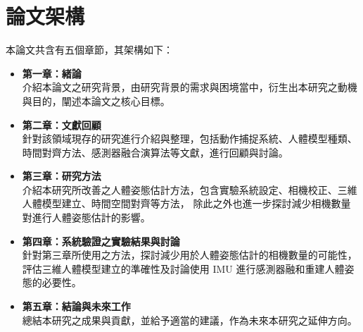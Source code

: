 
\section{論文架構}
本論文共含有五個章節，其架構如下：

\begin{itemize}
    \item \textbf{第一章：緒論}
    \\ 介紹本論文之研究背景，由研究背景的需求與困境當中，衍生出本研究之動機與目的，闡述本論文之核心目標。
    \item \textbf{第二章：文獻回顧}
    \\ 針對該領域現存的研究進行介紹與整理，包括動作捕捉系統、人體模型種類、時間對齊方法、感測器融合演算法等文獻，進行回顧與討論。
    \item \textbf{第三章：研究方法}
    \\ 介紹本研究所改善之人體姿態估計方法，包含實驗系統設定、相機校正、三維人體模型建立、時間空間對齊等方法，
    除此之外也進一步探討減少相機數量對進行人體姿態估計的影響。
    \item \textbf{第四章：系統驗證之實驗結果與討論}
    \\ 針對第三章所使用之方法，探討減少用於人體姿態估計的相機數量的可能性，評估三維人體模型建立的準確性及討論使用 IMU 進行感測器融和重建人體姿態的必要性。
    \item \textbf{第五章：結論與未來工作}
    \\ 總結本研究之成果與貢獻，並給予適當的建議，作為未來本研究之延伸方向。
\end{itemize}

\clearpage